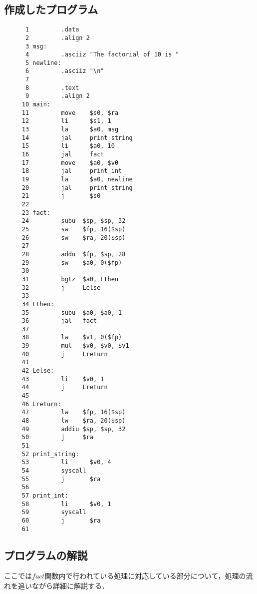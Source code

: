 \documentclass[a4j,11pt]{jarticle}
\begin{document}
\subsection{作成したプログラム}
\begin{verbatim}
      1	        .data
      2	        .align 2
      3	msg:
      4	        .asciiz "The factorial of 10 is "
      5	newline:
      6	        .asciiz "\n"
      7	
      8	        .text
      9	        .align 2
     10	main:
     11	        move    $s0, $ra
     12	        li      $s1, 1
     13	        la      $a0, msg
     14	        jal     print_string
     15	        li      $a0, 10
     16	        jal     fact
     17	        move    $a0, $v0
     18	        jal     print_int
     19	        la      $a0, newline
     20	        jal     print_string
     21	        j       $s0
     22	
     23	fact:
     24	        subu  $sp, $sp, 32
     25	        sw    $fp, 16($sp)
     26	        sw    $ra, 20($sp)
     27	
     28	        addu  $fp, $sp, 28
     29	        sw    $a0, 0($fp)
     30	
     31	        bgtz  $a0, Lthen
     32	        j     Lelse 
     33	
     34	Lthen:
     35	        subu  $a0, $a0, 1
     36	        jal   fact
     37	
     38	        lw    $v1, 0($fp)   
     39	        mul   $v0, $v0, $v1
     40	        j     Lreturn
     41	        
     42	Lelse:
     43	        li    $v0, 1
     44	        j     Lreturn
     45	
     46	Lreturn:
     47	        lw    $fp, 16($sp)
     48	        lw    $ra, 20($sp) 
     49	        addiu $sp, $sp, 32
     50	        j     $ra
     51	
     52	print_string:
     53	        li      $v0, 4
     54	        syscall
     55	        j       $ra
     56	
     57	print_int:
     58	        li      $v0, 1
     59	        syscall
     60	        j       $ra
     61	         
\end{verbatim}

\subsection{プログラムの解説}
ここでは$fact$関数内で行われている処理に対応している部分について，処理の流れを追いながら詳細に解説する．
\end{document}
